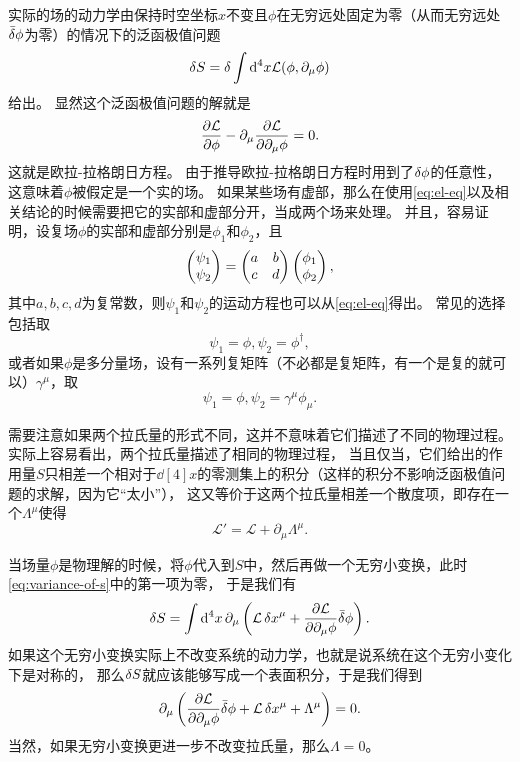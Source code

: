 \documentclass[UTF8, a4paper]{ctexart}
\begin{document}
实际的场的动力学由保持时空坐标$x$不变且$\phi$在无穷远处固定为零（从而无穷远处$\bar{\var}{\phi}$为零）的情况下的泛函极值问题
\begin{equation}
    \var{S} = \var{\int \dd[4]x \mathcal{L}(\phi, \partial_\mu \phi)}
    \label{eq:min-action}
\end{equation}
给出。
显然这个泛函极值问题的解就是
\begin{equation}
    \pdv{\mathcal{L}}{\phi} - \partial_\mu \pdv{\mathcal{L}}{\partial_\mu \phi} = 0.
    \label{eq:el-eq}
\end{equation}
这就是欧拉-拉格朗日方程。
由于推导欧拉-拉格朗日方程时用到了$\var{\phi}$的任意性，这意味着$\phi$被假定是一个实的场。
如果某些场有虚部，那么在使用\eqref{eq:el-eq}以及相关结论的时候需要把它的实部和虚部分开，当成两个场来处理。
并且，容易证明，设复场$\phi$的实部和虚部分别是$\phi_1$和$\phi_2$，且
\[
    \pmqty{\psi_1 \\ \psi_2} = \pmqty{a & b \\ c & d} \pmqty{\phi_1 \\ \phi_2},
\]
其中$a,b,c,d$为复常数，则$\psi_1$和$\psi_2$的运动方程也可以从\eqref{eq:el-eq}得出。
常见的选择包括取
\[
    \psi_1 = \phi, \psi_2 = \phi^\dagger,
\]
或者如果$\phi$是多分量场，设有一系列复矩阵（不必都是复矩阵，有一个是复的就可以）$\gamma^\mu$，取
\[
    \psi_1 = \phi, \psi_2 = \gamma^\mu \phi_\mu.
\]

需要注意如果两个拉氏量的形式不同，这并不意味着它们描述了不同的物理过程。
实际上容易看出，两个拉氏量描述了相同的物理过程，
当且仅当，它们给出的作用量$S$只相差一个相对于$\dd[4]{x}$的零测集上的积分（这样的积分不影响泛函极值问题的求解，因为它“太小”），
这又等价于这两个拉氏量相差一个散度项，即存在一个$\Lambda^\mu$使得
\begin{equation}
\mathcal{L}' = \mathcal{L} + \partial_\mu \Lambda^\mu.
\end{equation}

当场量$\phi$是物理解的时候，将$\phi$代入到$S$中，然后再做一个无穷小变换，此时\eqref{eq:variance-of-s}中的第一项为零，
于是我们有
\[
    \var{S} = \int \dd[4]{x} \partial_\mu \left( \mathcal{L} \var{x}^\mu + \pdv{\mathcal{L}}{\partial_\mu \phi} \bar{\var}\phi \right).
\]
如果这个无穷小变换实际上不改变系统的动力学，也就是说系统在这个无穷小变化下是对称的，
那么$\var{S}$就应该能够写成一个表面积分，于是我们得到
\begin{equation}
    \partial_\mu \left(\pdv{\mathcal{L}}{\partial_\mu \phi} \bar{\var}\phi + \mathcal{L} \var{x^\mu} + \Lambda^\mu\right) = 0.
    \label{eq:noether}
\end{equation}
当然，如果无穷小变换更进一步不改变拉氏量，那么$\Lambda=0$。
\end{document}

